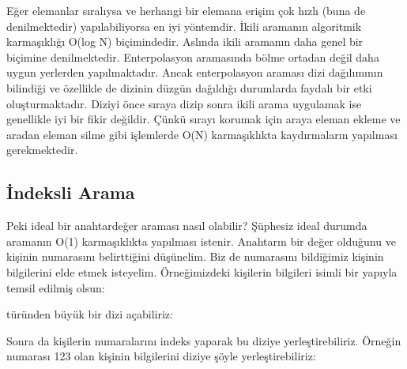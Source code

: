\documentclass[a4paper,10pt,turkish]{sphinxmanual}
\begin{document}
\sphinxAtStartPar
Eğer elemanlar sıralıysa ve herhangi bir elemana erişim çok hızlı (buna 
de denilmektedir) yapılabiliyorsa  en iyi yöntemdir. İkili
aramanın algoritmik karmaşıklığı O(log N) biçimindedir. Aslında ikili aramanın daha genel
bir biçimine  denilmektedir. Enterpolasyon
aramasında bölme ortadan değil daha uygun yerlerden yapılmaktadır. Ancak enterpolasyon
araması dizi dağılımının bilindiği ve özellikle de dizinin düzgün dağıldığı durumlarda
faydalı bir etki oluşturmaktadır. Diziyi önce sıraya dizip sonra ikili arama uygulamak
ise genellikle iyi bir fikir değildir. Çünkü sırayı korumak için araya eleman ekleme ve
aradan eleman silme gibi işlemlerde O(N) karmaşıklıkta kaydırmaların yapılması
gerekmektedir.


\subsection{İndeksli Arama}
\label{\detokenize{kernellinkedlistandhashtable:indeksli-arama}}
\sphinxAtStartPar
Peki ideal bir anahtar\sphinxhyphen{}değer araması nasıl olabilir? Şüphesiz ideal durumda aramanın
O(1) karmaşıklıkta yapılması istenir. Anahtarın bir  değer olduğunu ve kişinin
numarasını belirttiğini düşünelim. Biz de numarasını bildiğimiz kişinin bilgilerini elde
etmek isteyelim. Örneğimizdeki kişilerin bilgileri  isimli bir yapıyla temsil
edilmiş olsun:

\begin{sphinxVerbatim}[commandchars=\\\{\}]
\end{sphinxVerbatim}

\sphinxAtStartPar
{} türünden büyük bir dizi açabiliriz:

\begin{sphinxVerbatim}[commandchars=\\\{\}]
\PYG{p}{[}\PYG{p}{]}
\end{sphinxVerbatim}

\sphinxAtStartPar
Sonra da kişilerin numaralarını indeks yaparak bu diziye yerleştirebiliriz. Örneğin
numarası 123 olan kişinin bilgilerini diziye şöyle yerleştirebiliriz:
\end{document}
